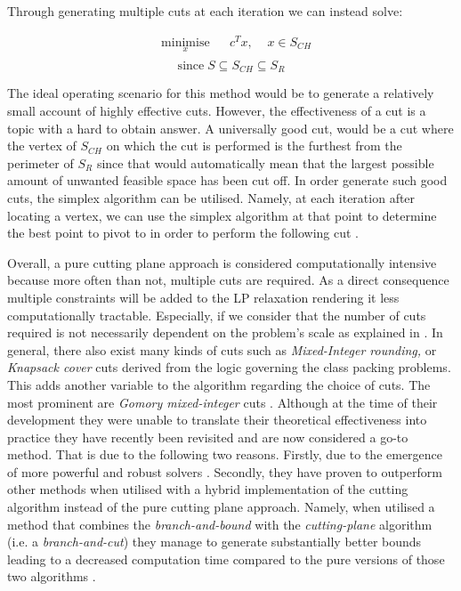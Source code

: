 \vspace{\baselineskip}
\noindent
Through generating multiple cuts at each iteration we can instead solve:

\begin{equation*}
\begin{aligned}
& \underset{x}{\text{minimise}}
& & c^{T}x, \;\;\;\; x \in S_{CH} \\
\end{aligned}
\end{equation*}
\[\text{since} \; S \subseteq S_{CH} \subseteq S_{R} \]


\vspace{\baselineskip}
\noindent
The ideal operating scenario for this method would be to generate a relatively small account of highly effective cuts. However, the effectiveness of a cut is a topic with a hard to obtain answer. A universally good cut, would be a cut where the vertex of $S_{CH}$ on which the cut is performed is the furthest from the perimeter of $S_{R}$ since that would automatically mean that the largest possible amount of unwanted feasible space has been cut off. In order generate such good cuts, the simplex algorithm can be utilised. Namely, at each iteration after locating a vertex, we can use the simplex algorithm at that point to determine the best point to pivot to in order to perform the following cut \cite{ieeeeee}.

\vspace{\baselineskip}
\noindent
Overall, a pure cutting plane approach is considered computationally intensive because more often than not, multiple cuts are required. As a direct consequence multiple constraints will be added to the LP relaxation rendering it less computationally tractable. Especially, if we consider that the number of cuts required is not necessarily dependent on the problem’s scale as explained in \cite{DUMMY:3}. In general, there also exist many kinds of cuts such as \textit{Mixed-Integer rounding, }or \textit{Knapsack cover }cuts derived from the logic governing the class packing problems. This adds another variable to the algorithm regarding the choice of cuts. The most prominent are \textit{Gomory mixed-integer }cuts \cite{gomory1958}. Although at the time of their development they were unable to translate their theoretical effectiveness into practice they have recently been revisited and are now considered a go-to method. That is due to the following two reasons. Firstly, due to the emergence of more powerful and robust solvers \cite{cornelio}. Secondly, they have proven to outperform other methods when utilised with a hybrid implementation of the cutting algorithm instead of the pure cutting plane approach. Namely, when utilised a method that combines the \textit{branch-and-bound} with the \textit{cutting-plane} algorithm (i.e. a \textit{branch-and-cut})\cite{BALAS19961} they manage to generate substantially better bounds leading to a decreased computation time compared to the pure versions of those two algorithms \cite{DUMMY:2}.\par

